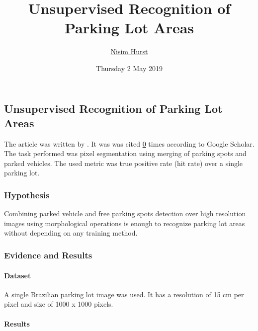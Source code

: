 \documentclass[]{article}
\title{Unsupervised Recognition of Parking Lot Areas}
\author{\href{mailto:langheran@gmail.com}{Nisim Hurst}}
\date{Thursday 2 May 2019}
\let\oldparagraph\paragraph
\renewcommand{\paragraph}[1]{\oldparagraph{#1}\mbox{}}
\begin{document}
\maketitle

\label{toc}

\hypertarget{unsupervised-recognition-of-parking-lot-areas}{%
\subsection{Unsupervised Recognition of Parking Lot Areas}\label{unsupervised-recognition-of-parking-lot-areas}}

The article was written by \autocite{mexasunsupervised}. It was was cited \href{https://scholar.google.com/scholar?q=Unsupervised\%20Recognition\%20of\%20Parking\%20Lot\%20Areas\%20mexas\&hl=en\&as_sdt=0\&as_vis=1\&oi=scholart\&sa=X\&ved=0ahUKEwiN67qBocbWAhXrjVQKHcX0BYwQgQMIMDAA}{0} times according to Google Scholar. The task performed was pixel segmentation using merging of parking spots and parked vehicles. The used metric was true positive rate (hit rate) over a single parking lot.

\hypertarget{hypothesis}{%
\subsubsection{Hypothesis}\label{hypothesis}}

Combining parked vehicle and free parking spots detection over high resolution images using morphological operations is enough to recognize parking lot areas without depending on any training method.

\hypertarget{evidence-and-results}{%
\subsubsection{Evidence and Results}\label{evidence-and-results}}

\hypertarget{dataset}{%
\paragraph{Dataset}\label{dataset}}

A single Brazilian parking lot image was used. It has a resolution of 15 cm per pixel and size of 1000 x 1000 pixels.

\hypertarget{results}{%
\paragraph{Results}\label{results}}
\end{document}
